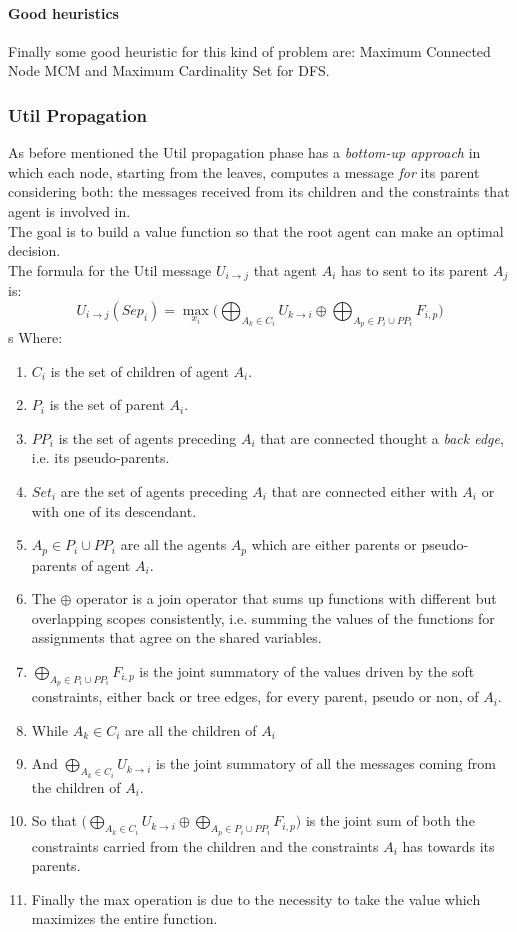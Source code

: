 \documentclass[10pt,a4paper]{article}
\begin{document}
\paragraph{Good heuristics}
Finally some good heuristic for this kind of problem are: Maximum Connected Node MCM and Maximum Cardinality Set for DFS.

\subsubsection{Util Propagation}
As before mentioned the Util propagation phase has a \textit{bottom-up approach} in which each node, starting from the leaves, computes a message \textit{for} its parent considering both: the messages received from its children and the constraints that agent is involved in.\\
The goal is to build a value function so that the root agent can make an optimal decision.\\
The formula for the Util message $U_{i\rightarrow j}$ that agent $A_i$ has to sent to its parent $A_j$ is:
\[U_{i\rightarrow j}(Sep_i)=\max_{x_i}\bigg(\bigoplus_{A_k \in C_i}U_{k\rightarrow i}\oplus \bigoplus_{A_p \in P_i \cup PP_i}F_{i,p}\bigg)\] s
Where:
\begin{enumerate}

\item $C_i$ is the set of children of agent $A_i$.
\item $P_i$ is the set of parent $A_i$.
\item $PP_i$ is the set of agents preceding $A_i$ that are connected thought a \textit{back edge}, i.e. its pseudo-parents.
\item $Set_i$ are the set of agents preceding $A_i$ that are connected either with $A_i$ or with one of its descendant. 
\item $A_p \in P_i \cup PP_i$ are all the agents $A_p$ which are either parents or pseudo-parents of agent $A_i$. 
\item The $\oplus$ operator is a join operator that sums up functions with different but overlapping scopes consistently, i.e. summing the values of the functions for assignments that agree on the shared variables.
\item $\bigoplus_{A_p \in P_i \cup PP_i}F_{i,p}$ is the joint summatory of the values driven by the soft constraints, either back or tree edges, for every parent, pseudo or non, of $A_i$.
\item While $A_k \in C_i$ are all the children of $A_i$
\item And $\bigoplus_{A_k \in C_i}U_{k\rightarrow i}$ is the joint summatory of all the messages coming from the children of $A_i$.
\item So that $\bigg(\bigoplus_{A_k \in C_i}U_{k\rightarrow i}\oplus \bigoplus_{A_p \in P_i \cup PP_i}F_{i,p}\bigg)$ is the joint sum of both the constraints carried from the children and the constraints $A_i$ has towards its parents. 
\item Finally the max operation is due to the necessity to take the value which maximizes the entire function.

\end{enumerate}
\end{document}
